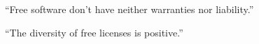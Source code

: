 \begin{frame}

\begin{center}
\huge{``Free software don't have neither warranties nor liability.''}
\end{center}

\end{frame}




\begin{frame}

\begin{center}
\huge{``The diversity of free licenses is positive.''}
\end{center}

\end{frame}









